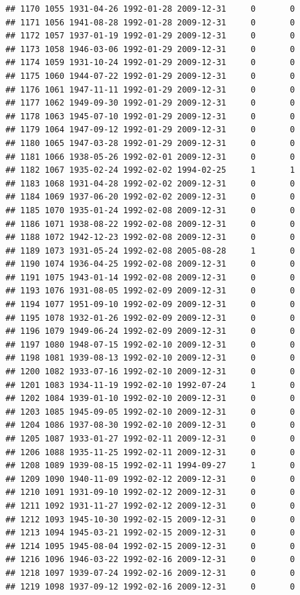 \documentclass[
]{book}
\theoremstyle{definition}
\theoremstyle{definition}
\theoremstyle{definition}
\theoremstyle{definition}
\theoremstyle{remark}
\begin{document}
\begin{verbatim}
## 1170 1055 1931-04-26 1992-01-28 2009-12-31     0       0
## 1171 1056 1941-08-28 1992-01-28 2009-12-31     0       0
## 1172 1057 1937-01-19 1992-01-29 2009-12-31     0       0
## 1173 1058 1946-03-06 1992-01-29 2009-12-31     0       0
## 1174 1059 1931-10-24 1992-01-29 2009-12-31     0       0
## 1175 1060 1944-07-22 1992-01-29 2009-12-31     0       0
## 1176 1061 1947-11-11 1992-01-29 2009-12-31     0       0
## 1177 1062 1949-09-30 1992-01-29 2009-12-31     0       0
## 1178 1063 1945-07-10 1992-01-29 2009-12-31     0       0
## 1179 1064 1947-09-12 1992-01-29 2009-12-31     0       0
## 1180 1065 1947-03-28 1992-01-29 2009-12-31     0       0
## 1181 1066 1938-05-26 1992-02-01 2009-12-31     0       0
## 1182 1067 1935-02-24 1992-02-02 1994-02-25     1       1
## 1183 1068 1931-04-28 1992-02-02 2009-12-31     0       0
## 1184 1069 1937-06-20 1992-02-02 2009-12-31     0       0
## 1185 1070 1935-01-24 1992-02-08 2009-12-31     0       0
## 1186 1071 1938-08-22 1992-02-08 2009-12-31     0       0
## 1188 1072 1942-12-23 1992-02-08 2009-12-31     0       0
## 1189 1073 1931-05-24 1992-02-08 2005-08-28     1       0
## 1190 1074 1936-04-25 1992-02-08 2009-12-31     0       0
## 1191 1075 1943-01-14 1992-02-08 2009-12-31     0       0
## 1193 1076 1931-08-05 1992-02-09 2009-12-31     0       0
## 1194 1077 1951-09-10 1992-02-09 2009-12-31     0       0
## 1195 1078 1932-01-26 1992-02-09 2009-12-31     0       0
## 1196 1079 1949-06-24 1992-02-09 2009-12-31     0       0
## 1197 1080 1948-07-15 1992-02-10 2009-12-31     0       0
## 1198 1081 1939-08-13 1992-02-10 2009-12-31     0       0
## 1200 1082 1933-07-16 1992-02-10 2009-12-31     0       0
## 1201 1083 1934-11-19 1992-02-10 1992-07-24     1       0
## 1202 1084 1939-01-10 1992-02-10 2009-12-31     0       0
## 1203 1085 1945-09-05 1992-02-10 2009-12-31     0       0
## 1204 1086 1937-08-30 1992-02-10 2009-12-31     0       0
## 1205 1087 1933-01-27 1992-02-11 2009-12-31     0       0
## 1206 1088 1935-11-25 1992-02-11 2009-12-31     0       0
## 1208 1089 1939-08-15 1992-02-11 1994-09-27     1       0
## 1209 1090 1940-11-09 1992-02-12 2009-12-31     0       0
## 1210 1091 1931-09-10 1992-02-12 2009-12-31     0       0
## 1211 1092 1931-11-27 1992-02-12 2009-12-31     0       0
## 1212 1093 1945-10-30 1992-02-15 2009-12-31     0       0
## 1213 1094 1945-03-21 1992-02-15 2009-12-31     0       0
## 1214 1095 1945-08-04 1992-02-15 2009-12-31     0       0
## 1216 1096 1946-03-22 1992-02-16 2009-12-31     0       0
## 1218 1097 1939-07-24 1992-02-16 2009-12-31     0       0
## 1219 1098 1937-09-12 1992-02-16 2009-12-31     0       0

\end{verbatim}
\end{document}
